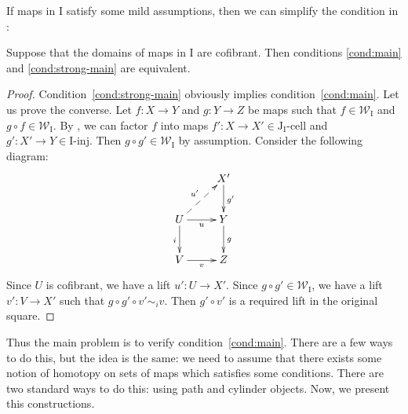\documentclass[reqno]{amsart}
\theoremstyle{definition}
\newcommand{\we}{\mathcal{W}}
\newcommand{\I}{\mathrm{I}}
\newcommand{\J}{\mathrm{J}}
\newcommand{\class}[2]{#1\text{-}\mathrm{#2}}
\newcommand{\Iinj}[1][\I]{\class{#1}{inj}}
\newcommand{\Icell}[1][\I]{\class{#1}{cell}}
\newcommand{\Jcell}[1][]{\Icell[\J#1]}
\begin{document}
If maps in $\I$ satisfy some mild assumptions, then we can simplify the condition in :
\begin{prop}[main]
Suppose that the domains of maps in $\I$ are cofibrant.
Then conditions \eqref{cond:main} and \eqref{cond:strong-main} are equivalent.
\end{prop}
\begin{proof}
Condition~\eqref{cond:strong-main} obviously implies condition~\eqref{cond:main}.
Let us prove the converse.
Let $f : X \to Y$ and $g : Y \to Z$ be maps such that $f \in \we_\I$ and $g \circ f \in \we_\I$.
By , we can factor $f$ into maps $f' : X \to X' \in \Jcell[_\I]$ and $g' : X' \to Y \in \Iinj$.
Then $g \circ g' \in \we_\I$ by assumption.
Consider the following diagram:
\[ \xymatrix{ & X' \ar[d]^{g'} \\
              U \ar[r]_u \ar[d]_i \ar@{-->}[ur]^{u'} & Y \ar[d]^g \\
              V \ar[r]_v & Z
            } \]
Since $U$ is cofibrant, we have a lift $u' : U \to X'$.
Since $g \circ g' \in \we_\I$, we have a lift $v' : V \to X'$ such that $g \circ g' \circ v' \sim_i v$.
Then $g' \circ v'$ is a required lift in the original square.
\end{proof}

Thus the main problem is to verify condition~\eqref{cond:main}.
There are a few ways to do this, but the idea is the same:
we need to assume that there exists some notion of homotopy on sets of maps which satisfies some conditions.
There are two standard ways to do this: using path and cylinder objects.
Now, we present this constructions.
\end{document}
